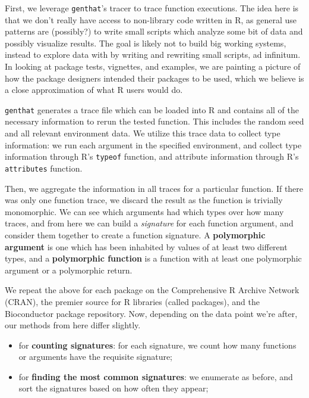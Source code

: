First, we leverage {\tt genthat}'s tracer to trace function executions.
The idea here is that we don't really have access to non-library code written in R, as general use patterns are (possibly?) to write small scripts which analyze some bit of data and possibly visualize results.
The goal is likely not to build big working systems, instead to explore data with by writing and rewriting small scripts, ad infinitum.
In looking at package tests, vignettes, and examples, we are painting a picture of how the package designers intended their packages to be used, which we believe is a close approximation of what R users would do.

{\tt genthat} generates a trace file which can be loaded into R and contains all of the necessary information to rerun the tested function.
This includes the random seed and all relevant environment data.
We utilize this trace data to collect type information:
we run each argument in the specified environment, and collect type information through R's {\tt typeof} function, and attribute information through R's {\tt attributes} function.

Then, we aggregate the information in all traces for a particular function. 
If there was only one function trace, we discard the result as the function is trivially monomorphic.
We can see which arguments had which types over how many traces, and from here we can build a \textit{signature} for each function argument, and consider them together to create a function signature.
A \textbf{polymorphic argument} is one which has been inhabited by values of at least two different types, and a \textbf{polymorphic function} is a function with at least one polymorphic argument or a polymorphic return.

We repeat the above for each package on the Comprehensive R Archive Network (CRAN), the premier source for R libraries (called packages), and the Bioconductor package repository.
Now, depending on the data point we're after, our methods from here differ slightly.

\begin{itemize}
    \item for \textbf{counting signatures}: for each signature, we count how many functions or arguments have the requisite signature;
    \item for \textbf{finding the most common signatures}: we enumerate as before, and sort the signatures based on how often they appear;
\end{itemize}

